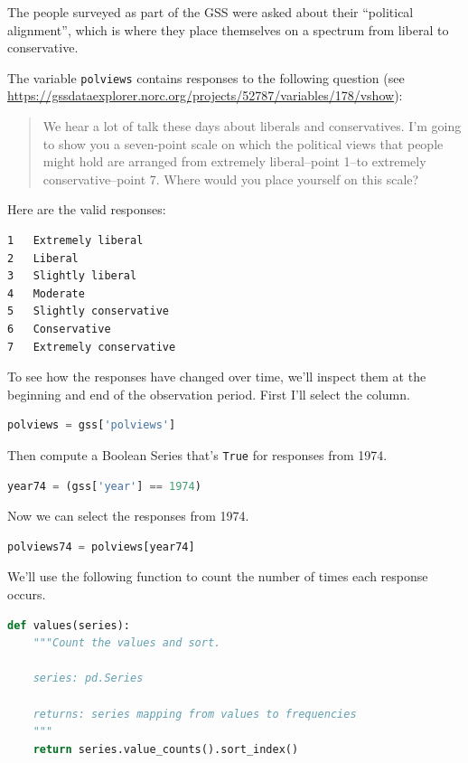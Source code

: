 The people surveyed as part of the GSS were asked about their
``political alignment'', which is where they place themselves on a
spectrum from liberal to conservative.

The variable \passthrough{\lstinline!polviews!} contains responses to
the following question (see
\url{https://gssdataexplorer.norc.org/projects/52787/variables/178/vshow}):

\begin{quote}
We hear a lot of talk these days about liberals and conservatives. I'm
going to show you a seven-point scale on which the political views that
people might hold are arranged from extremely liberal--point 1--to
extremely conservative--point 7. Where would you place yourself on this
scale?
\end{quote}

Here are the valid responses:

\begin{lstlisting}[]
1   Extremely liberal
2   Liberal
3   Slightly liberal
4   Moderate
5   Slightly conservative
6   Conservative
7   Extremely conservative
\end{lstlisting}

To see how the responses have changed over time, we'll inspect them at
the beginning and end of the observation period. First I'll select the
column.

\begin{lstlisting}[language=Python]
polviews = gss['polviews']
\end{lstlisting}

Then compute a Boolean Series that's \passthrough{\lstinline!True!} for
responses from 1974.

\begin{lstlisting}[language=Python]
year74 = (gss['year'] == 1974)
\end{lstlisting}

Now we can select the responses from 1974.

\begin{lstlisting}[language=Python]
polviews74 = polviews[year74]
\end{lstlisting}

We'll use the following function to count the number of times each
response occurs.

\begin{lstlisting}[language=Python]
def values(series):
    """Count the values and sort.
    
    series: pd.Series
    
    returns: series mapping from values to frequencies
    """
    return series.value_counts().sort_index()
\end{lstlisting}

